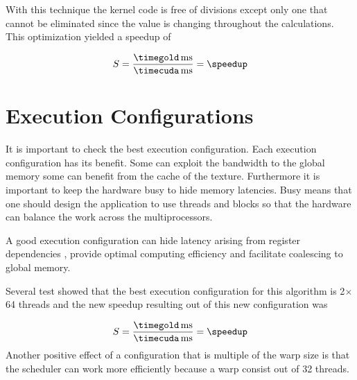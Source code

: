 With this technique the kernel code is free of divisions except only one that
cannot be eliminated since the value is changing throughout the calculations.
This optimization yielded a speedup of

\fpDiv{\speedup}{\timegold}{\timecuda}
\begin{equation*}\label{eq:speedup3}
	S = \frac{\unit[\timegold]{ms}}{\unit[\timecuda]{ms}} = \speedup
\end{equation*}


\section{Execution Configurations} %
\label{sec:run_configurations}
It is important to check the best execution configuration. Each execution
configuration has its benefit. Some can exploit the bandwidth to the global
memory some can benefit from the cache of the texture. Furthermore it is
important to keep the hardware busy to hide memory latencies. Busy means that
one should design the application to use threads and blocks so that the
hardware can balance the work across the multiprocessors.

A good execution configuration can hide latency arising from register
dependencies , provide optimal computing efficiency and facilitate coalescing to
global memory.

Several test showed that the best execution configuration for this algorithm is
2$\times$64 threads and the new speedup  resulting out of this new configuration
was

\fpDiv{\speedup}{\timegold}{\timecuda}
\begin{equation*}\label{eq:speedup4}
	S = \frac{\unit[\timegold]{ms}}{\unit[\timecuda]{ms}} = \speedup
\end{equation*}
 Another positive effect of a configuration that is multiple of the warp size is
that the scheduler can work more efficiently because a warp consist out of 32 
threads. 

